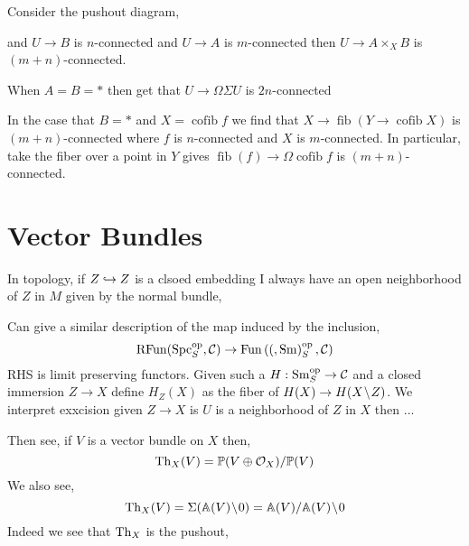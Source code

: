 \documentclass[12pt]{article}
\DeclareMathOperator{\fib}{\mathrm{fib}}
\DeclareMathOperator{\cofib}{\mathrm{cofib}}
\begin{document}
\begin{prop}
Consider the pushout diagram,
\begin{center}
\end{center}
and $U \to B$ is $n$-connected and $U \to A$ is $m$-connected then $U \to A \times_X B$ is $(m+n)$-connected.
\end{prop}

\begin{cor}
When $A = B = *$ then get that $U \to \Omega \Sigma U$ is $2n$-connected 
\end{cor}

\begin{cor}
In the case that $B = *$ and $X = \cofib{f}$ we find that $X \to \fib{(Y \to \cofib{X})}$ is $(m+n)$-connected where $f$ is $n$-connected and $X$ is $m$-connected. In particular, take the fiber over a point in $Y$ gives $\fib(f) \to \Omega \cofib{f}$ is $(m+n)$-connected.
\end{cor}

\section{Vector Bundles}

In topology, if $Z \hookrightarrow Z$ is a clsoed embedding I always have an open neighborhood of $Z$ in $M$ given by the normal bundle,
\begin{center}
\end{center}



Can give a similar description of the map induced by the inclusion,
\[ \mathrm{RFun}(\mathrm{Spc}_S^{\mathrm{op}}, \mathcal{C}) \to \mathrm{Fun}\left( (, \mathrm{Sm} \right)_S^{\mathrm{op}}, \mathcal{C}) \]
RHS is limit preserving functors. Given such a $H : \mathrm{Sm}_S^{\mathrm{op}} \to \mathcal{C}$ and a closed immersion $Z \to X$ define $H_Z(X)$ as the fiber of $H(X) \to H(X \! \setminus \! Z)$. We interpret exxcision given $Z \to X$ is $U$ is a neighborhood of $Z$ in $X$ then ...


Then see, if $V$ is a vector bundle on $X$ then,
\[ \mathrm{Th}_X(V) = \mathbb{P}(V \oplus \mathcal{O}_{X}) / \mathbb{P}(V) \]
We also see,
\[ \mathrm{Th}_X(V) = \Sigma (\mathbb{A}(V) \! \setminus \! 0) = \mathbb{A}(V) / \mathbb{A}(V) \! \setminus \! 0 \]
Indeed we see that $\mathrm{Th}_X$ is the pushout,
\begin{center}
\end{center}
\end{document}
